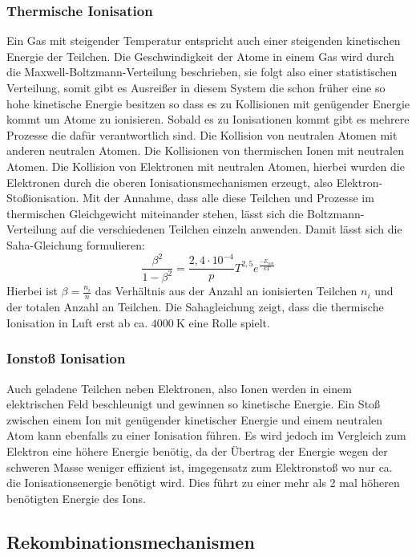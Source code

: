 \subsubsection{Thermische Ionisation}
\label{sec:thermion}
Ein Gas mit steigender Temperatur entspricht auch einer steigenden kinetischen Energie der Teilchen. Die Geschwindigkeit der Atome in einem Gas wird durch die Maxwell-Boltzmann-Verteilung beschrieben, sie folgt also einer statistischen Verteilung, somit gibt es Ausreißer in diesem System die schon früher eine so hohe kinetische Energie besitzen so dass es zu Kollisionen mit genügender Energie kommt um Atome zu ionisieren. Sobald es zu Ionisationen kommt gibt es mehrere Prozesse die dafür verantwortlich sind. Die Kollision von neutralen Atomen mit anderen neutralen Atomen. Die Kollisionen von thermischen Ionen mit neutralen Atomen. Die Kollision von Elektronen mit neutralen Atomen, hierbei wurden die Elektronen durch die oberen Ionisationsmechanismen erzeugt, also Elektron-Stoßionisation. Mit der Annahme, dass alle diese Teilchen und Prozesse im thermischen Gleichgewicht miteinander stehen, lässt sich die Boltzmann-Verteilung auf die verschiedenen Teilchen einzeln anwenden. Damit lässt sich die Saha-Gleichung formulieren:
\begin{equation}
    \frac{\beta^2}{1 - \beta^2} = \frac{2,4 \cdot 10^{-4}}{p}T^{2,5}e^{\frac{-E_{ion}}{kT}}
    \label{eq:saha}
\end{equation}
Hierbei ist \(\beta = \frac{n_i}{n}\) das Verhältnis aus der Anzahl an ionisierten Teilchen \(n_i\) und der totalen Anzahl an Teilchen. Die Sahagleichung zeigt, dass die thermische Ionisation in Luft erst ab ca. \(\SI{4000}{\kelvin}\) eine Rolle spielt. \cite{kuffel2000}

\subsubsection{Ionstoß Ionisation}
Auch geladene Teilchen neben Elektronen, also Ionen werden in einem elektrischen Feld beschleunigt und gewinnen so kinetische Energie. Ein Stoß zwischen einem Ion mit genügender kinetischer Energie und einem neutralen Atom kann ebenfalls zu einer Ionisation führen. Es wird jedoch im Vergleich zum Elektron eine höhere Energie benötig, da der Übertrag der Energie wegen der schweren Masse weniger effizient ist, imgegensatz zum Elektronstoß wo nur ca. die Ionisationsenergie benötigt wird. Dies führt zu einer mehr als 2 mal höheren benötigten Energie des Ions.

\subsection{Rekombinationsmechanismen}

